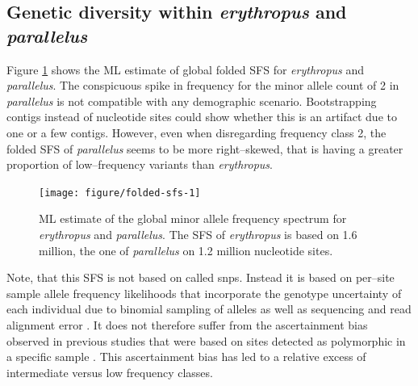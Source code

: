 \documentclass[a4paper,12pt,times,print,index,custombib,custommargin]{PhDThesisPSnPDF}\usepackage[]{graphicx}\usepackage[]{color}
\newenvironment{knitrout}{}{} %
\begin{document}
\subsection{Genetic diversity within \textit{erythropus} and \textit{parallelus}}
%
%
Figure \ref{Fig:folded-sfs} shows the ML estimate of global folded \gls{SFS} for \textit{erythropus} and \textit{parallelus}. The conspicuous spike in frequency for the minor allele count of 2 in \textit{parallelus} is not compatible with any demographic scenario. Bootstrapping contigs instead of nucleotide sites could show whether this is an artifact due to one or a few contigs. However, even when disregarding frequency class 2, the folded \gls{SFS} of \textit{parallelus} seems to be more right--skewed, that is having a greater proportion of low--frequency variants than \textit{erythropus}. 
%
\begin{figure}[htb]
\centering
\begin{knitrout}
\color{fgcolor}

{\centering \texttt{[image: figure/folded-sfs-1]} 

}



\end{knitrout}
\caption{ML estimate of the global minor allele frequency spectrum for \textit{erythropus} and \textit{parallelus}. The \gls{SFS} of  \textit{erythropus} is based on 1.6 million, the one of \textit{parallelus} on 1.2 million nucleotide sites.}
\label{Fig:folded-sfs}
\end{figure}
%
Note, that this \gls{SFS} is not based on called \glspl{snp}. Instead it is based on per--site sample allele frequency likelihoods that incorporate the genotype uncertainty of each individual due to binomial sampling of alleles as well as sequencing and read alignment error \citep{Li2008, Li2011, Nielsen2012}. It does not therefore suffer from the ascertainment bias observed in previous studies that were based on sites detected as polymorphic in a specific sample \citep{Albrechtsen2010, Korneliussen2013}. This ascertainment bias has led to a relative excess of intermediate versus low frequency classes. 
\end{document}
